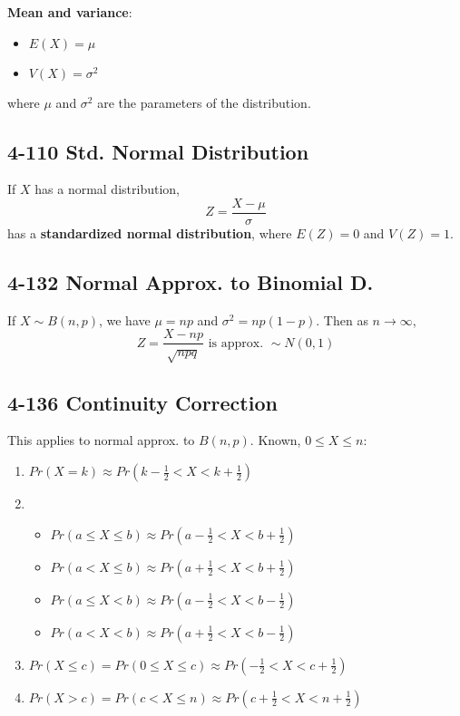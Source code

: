 \documentclass[12pt,landscape]{article}
\begin{document}
\begin{multicols}{3}
    \textbf{Mean and variance}:
    \begin{itemize}
        \item $E(X) = \mu$
        \item $V(X) = \sigma^2$
    \end{itemize}
    where $\mu$ and $\sigma^2$ are the parameters of the distribution.

    \subsection{4-110 Std. Normal Distribution}
    If $X$ has a normal distribution,
        $$ Z = \frac{X-\mu}{\sigma} $$
    has a \textbf{standardized normal distribution}, where $E(Z) = 0$ and $V(Z) = 1$.

    \subsection{4-132 Normal Approx. to Binomial D.}
    If $X \sim B(n,p)$, we have $\mu = np$ and $\sigma^2 = np(1-p)$. Then as $n \to \infty$,
        $$ Z = \frac{X-np}{\sqrt{npq}} \text{ is approx. } \sim N(0, 1) $$
    
    \subsection{4-136 Continuity Correction}
    This applies to normal approx. to $B(n,p)$. Known, $0 \leq X \leq n$:
    \begin{enumerate}
        \item $Pr(X = k) \approx Pr(k - \frac{1}{2} < X < k + \frac{1}{2})$
        \item \begin{itemize}
            \item $Pr(a \leq X \leq b) \approx Pr(a - \frac{1}{2} < X < b + \frac{1}{2})$
            \item $Pr(a < X \leq b) \approx Pr(a + \frac{1}{2} < X < b + \frac{1}{2})$
            \item $Pr(a \leq X < b) \approx Pr(a - \frac{1}{2} < X < b - \frac{1}{2})$
            \item $Pr(a < X < b) \approx Pr(a + \frac{1}{2} < X < b - \frac{1}{2})$
        \end{itemize}
        \item $Pr(X \leq c) = Pr(0 \leq X \leq c) \approx Pr(-\frac{1}{2} < X < c + \frac{1}{2})$
        \item $Pr(X > c) = Pr(c < X \leq n) \approx Pr(c + \frac{1}{2} < X < n + \frac{1}{2})$
    \end{enumerate}


\end{multicols}
\end{document}
